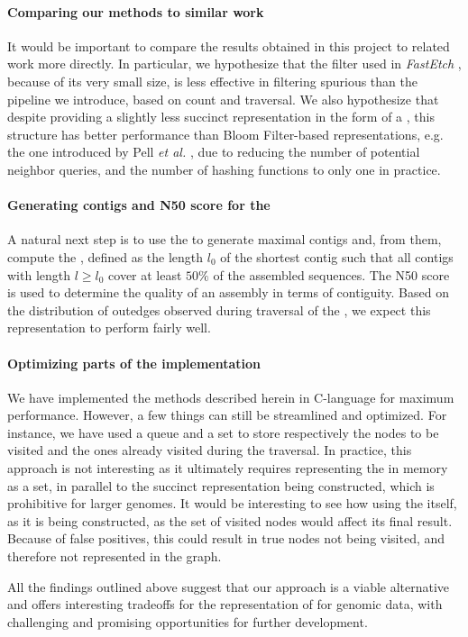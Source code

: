 \paragraph*{Comparing our methods to similar work}

It would be important to compare the results obtained in this project to related work more directly. In particular, we hypothesize that the  filter used in \emph{FastEtch} \cite{Ghosh2019}, because of its very small size, is less effective in filtering spurious  than the pipeline we introduce, based on count and traversal. We also hypothesize that despite providing a slightly less succinct \dBG representation in the form of a \dBHT, this structure has better performance than Bloom Filter-based representations, e.g. the one introduced by Pell \emph{et al.} \cite{Pell2012}, due to reducing the number of potential neighbor queries, and the number of hashing functions to only one in practice.

\paragraph*{Generating contigs and N50 score for the \dBHT}

A natural next step is to use the \dBHT to generate maximal contigs and, from them, compute the , defined as the length $l_0$ of the shortest contig such that all contigs with length $l \geq l_0$ cover at least $50\%$ of the assembled sequences. The N50 score is used to determine the quality of an assembly in terms of contiguity. Based on the distribution of outedges observed during traversal of the \dBHT, we expect this representation to perform fairly well.

\paragraph*{Optimizing parts of the implementation}

We have implemented the methods described herein in C-language for maximum performance. However, a few things can still be streamlined and optimized.
For instance, we have used a queue and a set to store respectively the nodes to be visited and the ones already visited during the \dBCM traversal. In practice, this approach is not interesting as it ultimately requires representing the \dBG in memory as a set, in parallel to the succinct representation being constructed, which is prohibitive for larger genomes. It would be interesting to see how using the \dBHT itself, as it is being constructed, as the set of visited nodes would affect its final result. Because of false positives, this could result in true nodes not being visited, and therefore not represented in the graph. 

\medskip

All the findings outlined above suggest that our approach is a viable alternative and offers interesting tradeoffs for the representation of  for genomic data, with challenging and promising opportunities for further development.
